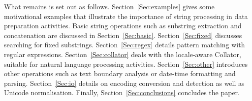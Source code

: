 \documentclass[nojss]{jss}
\begin{document}
%

%







\medskip
What remains is set out as follows.
Section~\ref{Sec:examples} gives some motivational examples
that illustrate the importance of string processing in data preparation
activities.
Basic string operations such as substring extraction and concatenation
are discussed in Section~\ref{Sec:basic}.
Section~\ref{Sec:fixed} discusses searching for fixed substrings.
Section~\ref{Sec:regex} details pattern matching with  regular
expressions.
Section~\ref{Sec:collator} deals with the locale-aware  Collator,
suitable for natural language processing activities.
Section~\ref{Sec:other} introduces other operations such as text boundary
analysis
or date-time formatting and parsing.
Section~\ref{Sec:io} details on encoding conversion and detection
as well as Unicode normalisation.
Finally, Section~\ref{Sec:conclusions} concludes the paper.
\end{document}

